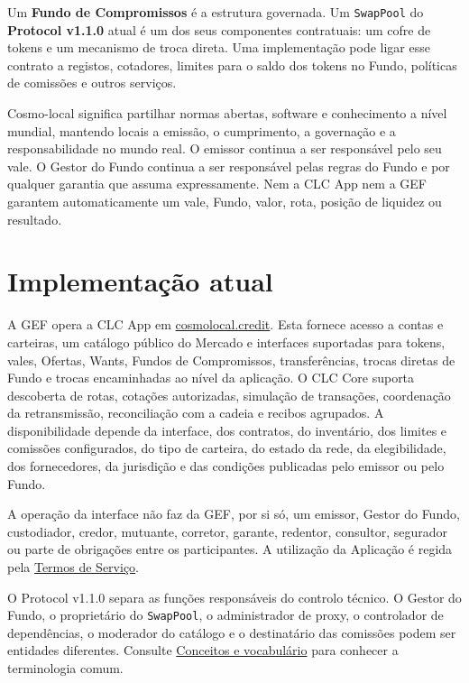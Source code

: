 \documentclass[11pt]{article}
\begin{document}
Um \textbf{Fundo de Compromissos} é a estrutura governada. Um \texttt{SwapPool} do \textbf{Protocol v1.1.0} atual é um dos seus componentes contratuais: um cofre de tokens e um mecanismo de troca direta. Uma implementação pode ligar esse contrato a registos, cotadores, limites para o saldo dos tokens no Fundo, políticas de comissões e outros serviços.

Cosmo-local significa partilhar normas abertas, software e conhecimento a nível mundial, mantendo locais a emissão, o cumprimento, a governação e a responsabilidade no mundo real. O emissor continua a ser responsável pelo seu vale. O Gestor do Fundo continua a ser responsável pelas regras do Fundo e por qualquer garantia que assuma expressamente. Nem a CLC App nem a GEF garantem automaticamente um vale, Fundo, valor, rota, posição de liquidez ou resultado.

\section*{Implementação atual}

A GEF opera a CLC App em \href{https://cosmolocal.credit}{cosmolocal.credit}. Esta fornece acesso a contas e carteiras, um catálogo público do Mercado e interfaces suportadas para tokens, vales, Ofertas, Wants, Fundos de Compromissos, transferências, trocas diretas de Fundo e trocas encaminhadas ao nível da aplicação. O CLC Core suporta descoberta de rotas, cotações autorizadas, simulação de transações, coordenação da retransmissão, reconciliação com a cadeia e recibos agrupados. A disponibilidade depende da interface, dos contratos, do inventário, dos limites e comissões configurados, do tipo de carteira, do estado da rede, da elegibilidade, dos fornecedores, da jurisdição e das condições publicadas pelo emissor ou pelo Fundo.

A operação da interface não faz da GEF, por si só, um emissor, Gestor do Fundo, custodiador, credor, mutuante, corretor, garante, redentor, consultor, segurador ou parte de obrigações entre os participantes. A utilização da Aplicação é regida pela \href{https://docs.cosmolocal.credit/pt/governance/terms}{Termos de Serviço}.

O Protocol v1.1.0 separa as funções responsáveis do controlo técnico. O Gestor do Fundo, o proprietário do \texttt{SwapPool}, o administrador de proxy, o controlador de dependências, o moderador do catálogo e o destinatário das comissões podem ser entidades diferentes. Consulte \href{https://docs.cosmolocal.credit/pt/introduction/concepts}{Conceitos e vocabulário} para conhecer a terminologia comum.
\end{document}
